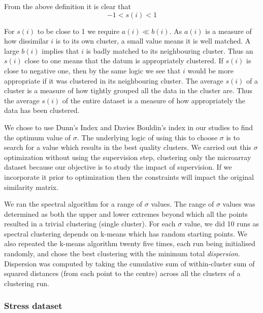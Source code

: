 From the above definition it is clear that
\[
-1<s(i)<1 
\]

For $s(i)$ to be close to 1 we require $a(i) \ll b(i)$. As $a(i)$ is a measure of how dissimilar $i$ is to its own cluster, a small value means it is well matched. 
A large $b(i)$ implies that $i$ is badly matched to its neighbouring cluster. Thus an $s(i)$ close to one means that the datum is appropriately clustered. If $s(i)$ is close to 
negative one, then by the same logic we see that $i$ would be more appropriate if it was clustered in its neighbouring cluster. The average $s(i)$ of a cluster is a measure of how tightly grouped all the 
data in the cluster are. Thus the average $s(i)$ of the entire dataset is a measure of how appropriately the data has been clustered. 

We chose to use Dunn's Index and Davies Bouldin's index in our studies to find the optimum value of $\sigma$.  The underlying logic of using this to choose $\sigma$ is to search for a value which results in the best quality clusters. 
We carried out this $\sigma$ optimization without using the supervision step, clustering only the microarray dataset because our objective is to study the impact of supervision. 
If we incorporate it prior to optimization then the constraints will impact the original similarity matrix.

We ran the spectral algorithm for a range of $\sigma$ values. The range of $\sigma$ values was determined as both the upper and lower extremes beyond which all the points 
resulted in a trivial clustering (single cluster).  For each $\sigma$ value, we did 10 runs as spectral clustering depends on k-means which has random starting points. 
We also repeated the k-means algorithm twenty five times, each run being initialised randomly, and chose the best clustering with the minimum total \textit{dispersion}. Dispersion was computed by taking the cumulative sum of within-cluster sum of squared distances (from each point to the centre) across all the clusters of a clustering run.  

\subsubsection{Stress dataset}

